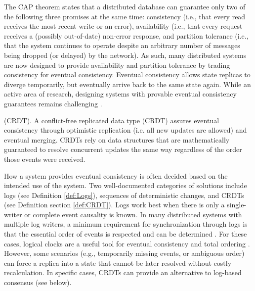 \documentclass{textile}
\begin{document}
The CAP theorem \cite{brewerRobustRobustDistributed2000,gilbertBrewerConjectureFeasibility2002a} states that a distributed database can guarantee only two of the following three promises at the same time: consistency (i.e., that every read receives the most recent write or an error), availability (i.e., that every request receives a (possibly out-of-date) non-error response, and partition tolerance (i.e., that the system continues to operate despite an arbitrary number of messages being dropped (or delayed) by the network). As such, many distributed systems are now designed to provide availability and partition tolerance by trading consistency for eventual consistency. Eventual consistency allows state replicas to diverge temporarily, but eventually arrive back to the same state again. While an active area of research, designing systems with provable eventual consistency guarantees remains challenging \cite{shapiroComprehensiveStudyConvergent2011a,almeidaDeltaStateReplicated2018}.


\begin{definition} (CRDT). A conflict-free replicated data type (CRDT) assures eventual consistency through optimistic replication (i.e. all new updates are allowed) and eventual merging. CRDTs rely on data structures that are mathematically guaranteed to resolve concurrent updates the same way regardless of the order those events were received. \end{definition} \label{def:CRDT}

How a system provides eventual consistency is often decided based on the intended use of the system. Two well-documented categories of solutions include logs (see Definition  \ref{def:Logs}), sequences of deterministic changes, and CRDTs (see Definition section  \ref{def:CRDT}). Logs work best when there is only a single-writer or complete event causality is known. In many distributed systems with multiple log writers, a minimum requirement for synchronization through logs is that the essential order of events is respected and can be determined \cite{schwarzDetectingCausalRelationships1994,katzInterleavingSetTemporal1990}. For these cases, logical clocks are a useful tool for eventual consistency and total ordering \cite{kulkarniLogicalPhysicalClocks2014}. However, some scenarios (e.g., temporarily missing events, or ambiguous order) can force a replica into a state that cannot be later resolved without costly recalculation. In specific cases, CRDTs can provide an alternative to log-based consensus (see below). 
\end{document}
